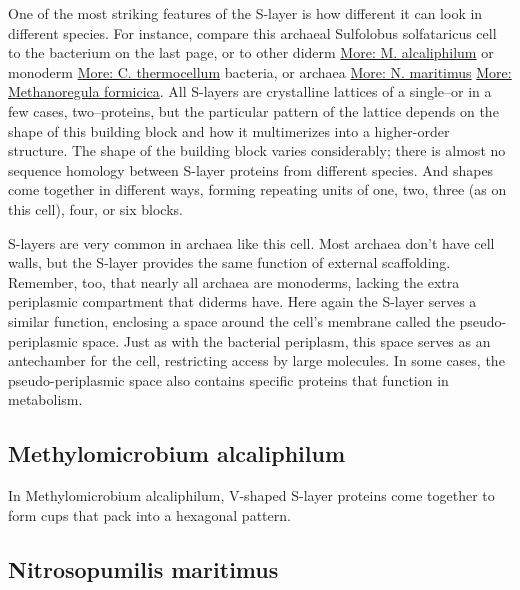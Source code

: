 \documentclass[]{tufte-book}
\begin{document}
One of the most striking features of the S-layer is how different it can look in different species. For instance, compare this archaeal Sulfolobus solfataricus cell to the bacterium on the last page, or to other diderm \protect\hyperlink{M._alcaliphilum}{More: M. alcaliphilum} or monoderm \protect\hyperlink{}{More: C. thermocellum} bacteria, or archaea \protect\hyperlink{N._maritimus}{More: N. maritimus} \protect\hyperlink{Methanoregula_formicica}{More: Methanoregula formicica}. All S-layers are crystalline lattices of a single--or in a few cases, two--proteins, but the particular pattern of the lattice depends on the shape of this building block and how it multimerizes into a higher-order structure. The shape of the building block varies considerably; there is almost no sequence homology between S-layer proteins from different species. And shapes come together in different ways, forming repeating units of one, two, three (as on this cell), four, or six blocks.

S-layers are very common in archaea like this cell. Most archaea don't have cell walls, but the S-layer provides the same function of external scaffolding. Remember, too, that nearly all archaea are monoderms, lacking the extra periplasmic compartment that diderms have. Here again the S-layer serves a similar function, enclosing a space around the cell's membrane called the pseudo-periplasmic space. Just as with the bacterial periplasm, this space serves as an antechamber for the cell, restricting access by large molecules. In some cases, the pseudo-periplasmic space also contains specific proteins that function in metabolism.

\hypertarget{htmlwidget-84caec2d4ccd3f5b19a8}{}

\hypertarget{M._alcaliphilum}{%
\subsection{Methylomicrobium alcaliphilum}\label{M._alcaliphilum}}

In Methylomicrobium alcaliphilum, V-shaped S-layer proteins come together to form cups that pack into a hexagonal pattern.

\hypertarget{htmlwidget-a1cbff60492c9593ef40}{}

\hypertarget{N._maritimus}{%
\subsection{Nitrosopumilis maritimus}\label{N._maritimus}}
\end{document}
